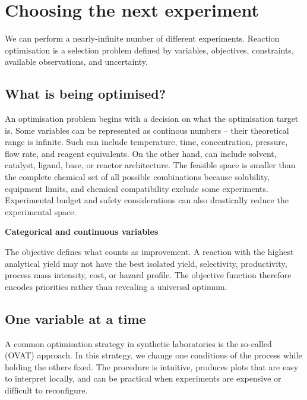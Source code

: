 
\chapter{Choosing the next experiment}

\begin{notebox}
  We can perform a nearly-infinite number of different experiments.
  Reaction optimisation is a selection problem defined by variables, objectives, constraints, available observations, and uncertainty.
\end{notebox}

\section{What is being optimised?}

An optimisation problem begins with a decision on what the optimisation target is.
Some variables can be represented as continous numbers -- their theoretical range is infinite.
Such  can include temperature, time, concentration, pressure, flow rate, and reagent equivalents.
On the other hand,  can include solvent, catalyst, ligand, base, or reactor architecture.
The feasible space is smaller than the complete chemical set of all possible combinations because solubility, equipment limits, and chemical compatibility exclude some experiments.
Experimental budget and safety considerations can also drastically reduce the experimental space.

\solution{6cm}
{ \centering
  \textbf{Categorical and continuous variables}
}

The objective defines what counts as improvement.
A reaction with the highest analytical yield may not have the best isolated yield, selectivity, productivity, process mass intensity, cost, or hazard profile.
The objective function therefore encodes priorities rather than revealing a universal optimum.

\section{One variable at a time}

A common optimisation strategy in synthetic laboratories is the so-called  (OVAT) approach.
In this strategy, we change one conditions of the process while holding the others fixed.
The procedure is intuitive, produces plots that are easy to interpret locally, and can be practical when experiments are expensive or difficult to reconfigure.

